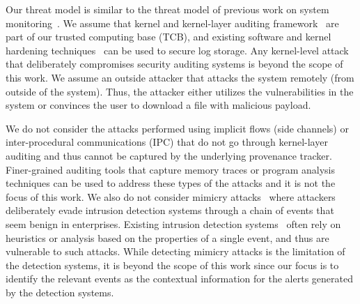 %





Our threat model is similar to the threat model of previous work on system monitoring~\cite{backtracking,backtracking2,loggc,gao2018aiql,gao2018saql,gao2021enabling,liu2018priotracker,hassan2019nodoze}. 
We assume that kernel and kernel-layer auditing framework~\cite{auditd,etw,dtrace,sysdig} are part of our trusted computing base (TCB), and existing software and kernel hardening techniques~\cite{trustkernel,tamperlog} can be used to secure log storage.
Any kernel-level attack that deliberately compromises security auditing systems is beyond the scope of this work.
We assume an outside attacker that attacks the system remotely (from outside of the system). Thus, the attacker either utilizes the vulnerabilities in the system or convinces the user to download a file with malicious payload.



We do not consider the attacks performed using implicit flows (\eg side channels) or inter-procedural communications (IPC) that do not go through kernel-layer auditing and thus cannot be captured by the underlying provenance tracker.
Finer-grained auditing tools that capture memory traces or program analysis techniques can be used to address these types of the attacks and it is not the focus of this work.
We also do not consider mimicry attacks~\cite{mimicry} where attackers deliberately evade intrusion detection systems through a chain of events that seem benign in enterprises. 
Existing intrusion detection systems~\cite{securitybook,intrusionbook,netwrix} often rely on heuristics or analysis based on the properties of a single event, and thus are vulnerable to such attacks.
While detecting mimicry attacks is the limitation of the detection systems, it is beyond the scope of this work since our focus is to identify the relevant events as the contextual information for the alerts generated by the detection systems.

